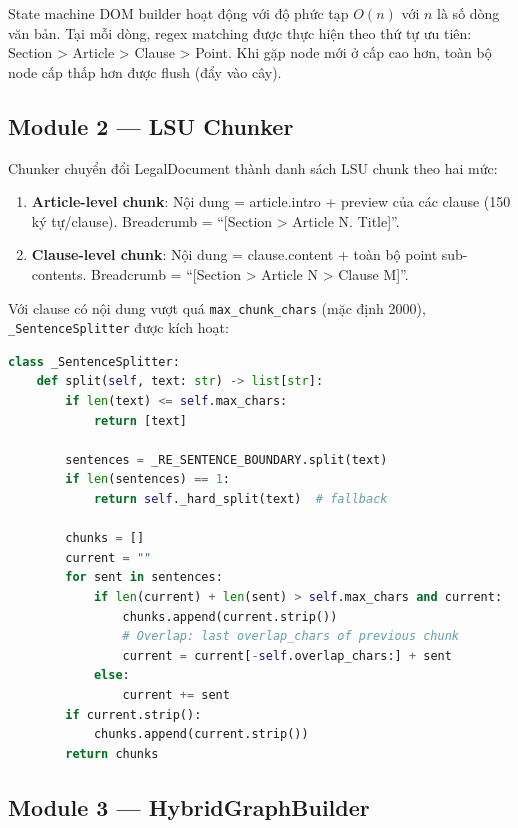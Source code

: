 State machine DOM builder hoạt động với độ phức tạp $O(n)$ với $n$ là số dòng văn bản. Tại mỗi dòng, regex matching được thực hiện theo thứ tự ưu tiên: Section > Article > Clause > Point. Khi gặp node mới ở cấp cao hơn, toàn bộ node cấp thấp hơn được flush (đẩy vào cây).

\subsection{Module 2 — LSU Chunker}

Chunker chuyển đổi LegalDocument thành danh sách LSU chunk theo hai mức:

\begin{enumerate}[label=(\arabic*)]
    \item \textbf{Article-level chunk}: Nội dung = article.intro + preview của các clause (150 ký tự/clause). Breadcrumb = ``[Section > Article N. Title]''.
    \item \textbf{Clause-level chunk}: Nội dung = clause.content + toàn bộ point sub-contents. Breadcrumb = ``[Section > Article N > Clause M]''.
\end{enumerate}

Với clause có nội dung vượt quá \texttt{max\_chunk\_chars} (mặc định 2000), \texttt{\_SentenceSplitter} được kích hoạt:

\begin{lstlisting}[language=Python, caption={Thuật toán SentenceSplitter — chia clause dài tại ranh giới câu}, label={lst:sentence_splitter}]
class _SentenceSplitter:
    def split(self, text: str) -> list[str]:
        if len(text) <= self.max_chars:
            return [text]

        sentences = _RE_SENTENCE_BOUNDARY.split(text)
        if len(sentences) == 1:
            return self._hard_split(text)  # fallback

        chunks = []
        current = ""
        for sent in sentences:
            if len(current) + len(sent) > self.max_chars and current:
                chunks.append(current.strip())
                # Overlap: last overlap_chars of previous chunk
                current = current[-self.overlap_chars:] + sent
            else:
                current += sent
        if current.strip():
            chunks.append(current.strip())
        return chunks
\end{lstlisting}

\subsection{Module 3 — HybridGraphBuilder}

